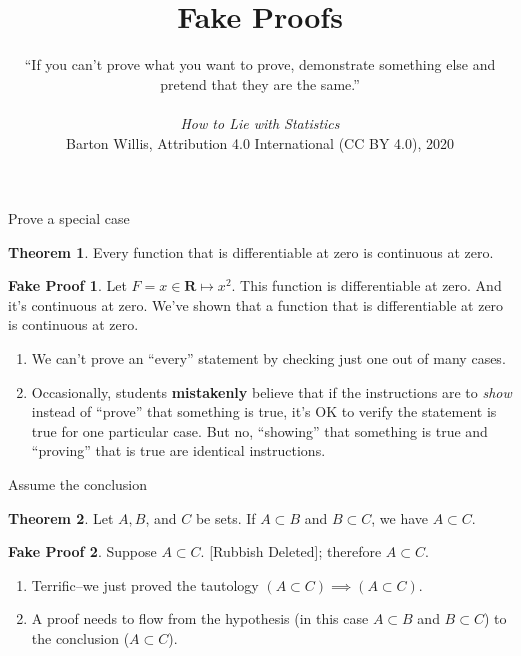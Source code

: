 \documentclass[fleqn]{beamer}
\title{\textbf{Fake Proofs}}
\subtitle{%
  ``If you can't prove what you want to prove, demonstrate something else and pretend that they are the same.''  \\   \vspace{0.15in}{Darrell Huff} \\ \vspace{0.15in} \emph{How to Lie with Statistics} \\ 
 \vspace{1.0in}
  \tiny Barton Willis, Attribution 4.0 International (CC BY 4.0), 2020 \normalsize
   }
\date{}
\newcommand{\reals}{\mathbf{R}}
\theoremstyle{definition}
\newtheorem{myth}{Theorem}
\newtheorem{myfakeproof}{Fake Proof}
\begin{document}
\frame{\titlepage}

\begin{frame}{Prove a special case}

\begin{myth}   Every function  that is differentiable at zero is continuous at zero.  \end{myth}

\begin{myfakeproof}  Let \(F = x \in \reals \mapsto x^2\).  This function is differentiable at zero. And it's continuous at zero. We've shown that  a function that is differentiable at zero is continuous at zero.
\end{myfakeproof}

\begin{enumerate}
\item We can't prove an ``every'' statement by checking just one out of many cases.
\item Occasionally, students \textbf{mistakenly} believe that if the instructions are to \emph{show} instead of ``prove'' that something is true, it's OK to verify the statement is true for one particular case. But no, ``showing'' that something is true and ``proving'' that is true are identical instructions.


\end{enumerate}

\end{frame}

\begin{frame}{Assume the conclusion}


\begin{myth}   Let \(A,B\),  and \(C\) be sets.  If \(A \subset B\) and \(B \subset C\), we have \(A \subset C\). \end{myth}

\begin{myfakeproof}  Suppose \(A \subset C\).  [Rubbish Deleted]; therefore  \(A \subset C\). \end{myfakeproof}

\begin{enumerate}
\item Terrific--we just proved the tautology \(   (A \subset C) \implies  (A \subset C) \).

\item A proof needs to flow from the hypothesis (in this case  \(A \subset B\) and \(B \subset C\)) to the conclusion (\(A \subset C\)).
\end{enumerate}

\end{frame}
\end{document}
